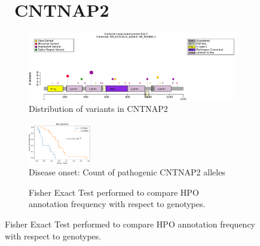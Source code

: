 \begin{figure}[htbp]
\section*{ CNTNAP2}
\centering
\begin{subfigure}[b]{0.95\textwidth}
\centering
\includegraphics[width=\textwidth]{ img/CNTNAP2_protein_diagram.pdf} 
\captionsetup{justification=raggedright,singlelinecheck=false}
\caption{Distribution of variants in CNTNAP2}
\end{subfigure}

\vspace{2em}

\begin{subfigure}[b]{0.95\textwidth}
\centering
\includegraphics[width=0.3\textwidth]{ img/CNTNAP2_stats.pdf} 
\captionsetup{justification=raggedright,singlelinecheck=false}
\caption{Disease onset: Count of pathogenic CNTNAP2 alleles}
\end{subfigure}

\vspace{2em}

\begin{subfigure}[b]{0.95\textwidth}
\centering
{}
\captionsetup{justification=raggedright,singlelinecheck=false}
\caption{Fisher Exact Test performed to compare HPO annotation frequency with respect to genotypes.}
\end{subfigure}


\end{figure}
